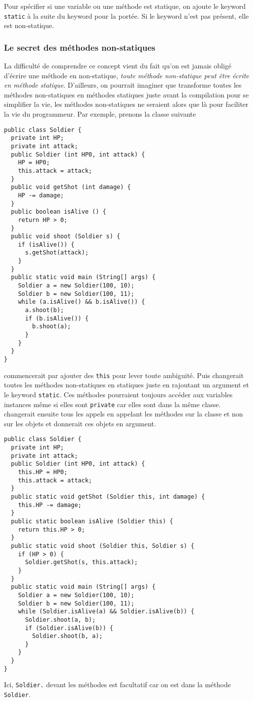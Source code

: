 Pour spécifier si une variable ou une méthode est statique,
on ajoute le keyword \lstinline|static|
à la suite du keyword pour la portée.
Si le keyword n'est pas présent, elle est non-statique.

\subsubsection{Le secret des méthodes non-statiques}
La difficulté de comprendre ce concept vient du fait
qu'on est jamais obligé d'écrire une méthode en non-statique,
\emph{toute méthode non-statique peut être écrite en méthode
statique}.
D'ailleurs, on pourrait imaginer que \java{} transforme toutes
les méthodes non-statiques en méthodes statiques juste avant
la compilation pour se simplifier la vie,
les méthodes non-statiques ne
seraient alors que là pour faciliter la vie du programmeur.
Par exemple, prenons la classe suivante
\begin{lstlisting}
public class Soldier {
  private int HP;
  private int attack;
  public Soldier (int HP0, int attack) {
    HP = HP0;
    this.attack = attack;
  }
  public void getShot (int damage) {
    HP -= damage;
  }
  public boolean isAlive () {
    return HP > 0;
  }
  public void shoot (Soldier s) {
    if (isAlive()) {
      s.getShot(attack);
    }
  }
  public static void main (String[] args) {
    Soldier a = new Soldier(100, 10);
    Soldier b = new Soldier(100, 11);
    while (a.isAlive() && b.isAlive()) {
      a.shoot(b);
      if (b.isAlive()) {
        b.shoot(a);
      }
    }
  }
}
\end{lstlisting}
\java{} commencerait par ajouter des \lstinline{this} pour lever
toute ambiguité.
Puis changerait toutes les méthodes non-statiques en statiques
juste en rajoutant un argument et le keyword \lstinline{static}.
Ces méthodes pourraient toujours accéder aux variables instances même si elles
sont \lstinline{private} car elles sont dans la même classe.
\java{} changerait ensuite tous les appels en appelant les méthodes
sur la classe et non sur les objets et donnerait ces objets en argument.
\begin{lstlisting}
public class Soldier {
  private int HP;
  private int attack;
  public Soldier (int HP0, int attack) {
    this.HP = HP0;
    this.attack = attack;
  }
  public static void getShot (Soldier this, int damage) {
    this.HP -= damage;
  }
  public static boolean isAlive (Soldier this) {
    return this.HP > 0;
  }
  public static void shoot (Soldier this, Soldier s) {
    if (HP > 0) {
      Soldier.getShot(s, this.attack);
    }
  }
  public static void main (String[] args) {
    Soldier a = new Soldier(100, 10);
    Soldier b = new Soldier(100, 11);
    while (Soldier.isAlive(a) && Soldier.isAlive(b)) {
      Soldier.shoot(a, b);
      if (Soldier.isAlive(b)) {
        Soldier.shoot(b, a);
      }
    }
  }
}
\end{lstlisting}
Ici, \lstinline{Soldier.} devant les méthodes est facultatif
car on est dans la méthode \lstinline{Soldier}.

